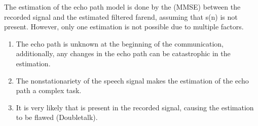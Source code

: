 \documentclass[letterpaper,10pt,english]{jupyterBook}
\begin{document}
\sphinxAtStartPar
The estimation of the echo path model is done by  the  (MMSE) between the recorded signal and the estimated
filtered far\sphinxhyphen{}end, assuming that s(n) is not present. However, only one
estimation is not possible due to multiple factors.
\begin{enumerate}
%
\item {} 
\sphinxAtStartPar
The echo path is unknown at the beginning of the communication,
additionally, any changes in the echo path can be catastrophic in
the estimation.

\item {} 
\sphinxAtStartPar
The non\sphinxhyphen{}stationariety of the speech signal makes the estimation of
the echo path a complex task.

\item {} 
\sphinxAtStartPar
It is very likely that  is present in the recorded signal,
causing the estimation to be flawed (Double\sphinxhyphen{}talk).

\end{enumerate}
\end{document}
